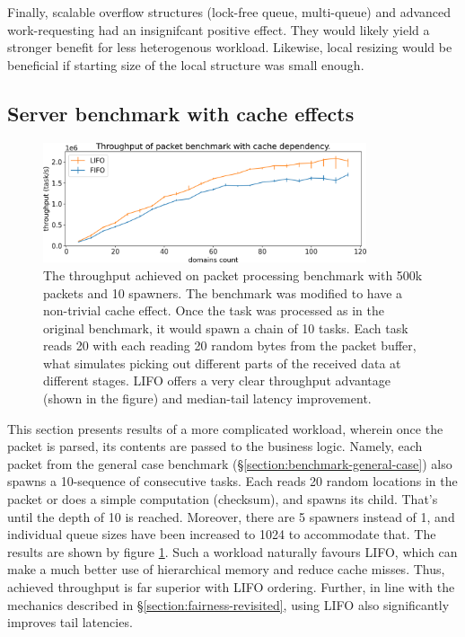 \documentclass[12pt,a4paper,twoside]{report}
\begin{document}
Finally, scalable overflow structures (lock-free queue, multi-queue) and advanced work-requesting had an insignifcant positive effect. They would likely yield a stronger benefit for less heterogenous workload. Likewise, local resizing would be beneficial if starting size of the local structure was small enough.

\subsection{Server benchmark with cache effects}
\label{section:server-bench-with-cache-effects}

\begin{figure} 
    \centering 
    \includegraphics[width=0.85\textwidth]{eval/packet-basic-lifo-better.png}
    \caption{The throughput achieved on packet processing benchmark with 500k packets and 10 spawners. The benchmark was modified to have a non-trivial cache effect. Once the task was processed as in the original benchmark, it would spawn a chain of 10 tasks. Each task reads 20 with each reading 20 random bytes from the packet buffer, what simulates picking out different parts of the received data at different stages. LIFO offers a very clear throughput advantage (shown in the figure) and median-tail latency improvement.}
   \label{fig:packet-lifo-better}
\end{figure}

This section presents results of a more complicated workload, wherein once the packet is parsed, its contents are passed to the business logic. Namely, each packet from the general case benchmark (\S\ref{section:benchmark-general-case}) also spawns a 10-sequence of consecutive tasks. Each reads 20 random locations in the packet or does a simple computation (checksum), and spawns its child. That's until the depth of 10 is reached. Moreover, there are 5 spawners instead of 1, and individual queue sizes have been increased to 1024 to accommodate that. The results are shown by figure \ref{fig:packet-lifo-better}. Such a workload naturally favours LIFO, which can make a much better use of hierarchical memory and reduce cache misses. Thus, achieved throughput is far superior with LIFO ordering. Further, in line with the mechanics described in \S\ref{section:fairness-revisited}, using LIFO also significantly improves tail latencies.
\end{document}
